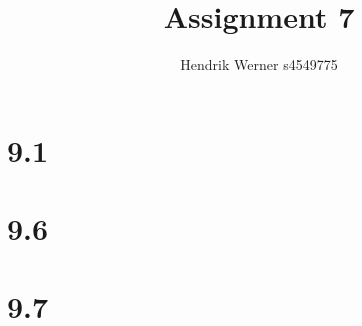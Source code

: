 \documentclass[12pt]{article}
\title{Assignment 7}
\author{Hendrik Werner s4549775}
\begin{document}
\maketitle

\section*{9.1}
\section*{9.6}
\section*{9.7}
\end{document}
